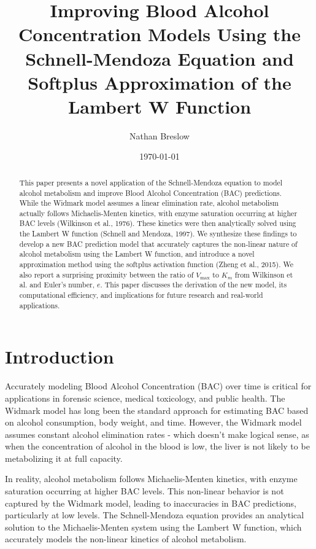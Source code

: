 \documentclass[12pt]{article}
\title{\textbf{Improving Blood Alcohol Concentration Models Using the Schnell-Mendoza Equation and Softplus Approximation of the Lambert W Function}}
\author{Nathan Breslow}
\date{\today}
\begin{document}
\maketitle
\thispagestyle{empty}  %

\begin{abstract}
This paper presents a novel application of the Schnell-Mendoza equation to model alcohol metabolism and improve Blood Alcohol Concentration (BAC) predictions. While the Widmark model assumes a linear elimination rate, alcohol metabolism actually follows Michaelis-Menten kinetics, with enzyme saturation occurring at higher BAC levels (Wilkinson et al., 1976). These kinetics were then analytically solved using the Lambert W function (Schnell and Mendoza, 1997). We synthesize these findings to develop a new BAC prediction model that accurately captures the non-linear nature of alcohol metabolism using the Lambert W function, and introduce a novel approximation method using the softplus activation function (Zheng et al., 2015). We also report a surprising proximity between the ratio of $V_{\text{max}}$ to $K_m$ from Wilkinson et al. and Euler's number, $e$. This paper discusses the derivation of the new model, its computational efficiency, and implications for future research and real-world applications.
\end{abstract}

\section{Introduction}

Accurately modeling Blood Alcohol Concentration (BAC) over time is critical for applications in forensic science, medical toxicology, and public health. The Widmark model has long been the standard approach for estimating BAC based on alcohol consumption, body weight, and time. However, the Widmark model assumes constant alcohol elimination rates - which doesn't make logical sense, as when the concentration of alcohol in the blood is low, the liver is not likely to be metabolizing it at full capacity.

In reality, alcohol metabolism follows Michaelis-Menten kinetics, with enzyme saturation occurring at higher BAC levels. This non-linear behavior is not captured by the Widmark model, leading to inaccuracies in BAC predictions, particularly at low levels. The Schnell-Mendoza equation provides an analytical solution to the Michaelis-Menten system using the Lambert W function, which accurately models the non-linear kinetics of alcohol metabolism.
\end{document}
